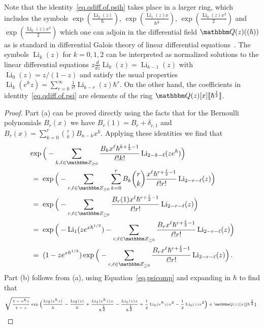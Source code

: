 \documentclass[12pt,reqno]{amsart}
\theoremstyle{definition}
\def\BZ{\mathbbm Z}
\def\BQ{\mathbbm Q}
\def\be{\begin{equation}}
\def\ee{\end{equation}}
\renewcommand{\=}{\;=\;}
\newcommand{\Li}{\operatorname{Li}}
\newcommand{\hroot}{\hbar^{\frac{1}{2}}}
\begin{document}
Note that the identity~\eqref{eq.qdiff.of.psih} takes place in a larger ring,
which includes the symbols
$\exp(\frac{\Li_{2}(z)}{\hbar})$, $\exp(\frac{\Li_{1}(z)x}{\hroot})$,
$\exp(\frac{\Li_{0}(z)x^2}{2})$ and $\exp(\frac{\Li_{0}(z)x^2}{2})$ which one can
adjoin in the differential field $\BQ(z)((\hbar))$ as is standard in differential
Galois theory of linear differential equations~\cite{Singer:galois-differential}.
The symbols $\Li_k(z)$ for $k=0,1,2$ can be interpreted as normalized solutions
to the linear differential equations $z \frac{d}{dz} \Li_k(z) = \Li_{k-1}(z)$
with $\Li_0(z)=z/(1-z)$ and satisfy the usual properties
$\Li_k(e^\hbar z) = \sum_{r=0}^\infty \frac{1}{r!} \Li_{k-r}(z) \hbar^r$.
On the other hand, the coefficients in identity~\eqref{eq.qdiff.of.psi}
are elements of the ring $\BQ(z)[x]\llbracket \hroot \rrbracket$.

\begin{proof}
Part (a) can be proved directly using the facts that for
the Bernoulli polynomials $B_{r}(x)$ we have
$B_{r}(1)=B_{r}+\delta_{r,1}$ and
$B_{r}(x)=\sum_{k=0}^{r}\binom{r}{k}B_{n-k}x^{k}$.
Applying these identities we find that
\be
\begin{aligned}
&\exp\Big(-\sum_{k,\ell\in\BZ_{\geq0}}
\frac{B_{k}x^{\ell}\hbar^{k+\frac{\ell}{2}-1}}{\ell!k!}\Li_{2-k-\ell}(ze^{\hbar})\Big)
\\
&\=
\exp\Big(-\sum_{r,\ell\in\BZ_{\geq0}}\sum_{k=0}^{r}B_{k}\binom{r}{k}
\frac{x^{\ell}\hbar^{r+\frac{\ell}{2}-1}}{\ell!r!}\Li_{2-r-\ell}(z)\Big)\\
&\=
\exp\Big(-\sum_{r,\ell\in\BZ_{\geq0}}
\frac{B_{r}(1)x^{\ell}\hbar^{r+\frac{\ell}{2}-1}}{\ell!r!}\Li_{2-r-\ell}(z)\Big)\\
&\=
\exp\Big(-\Li_{1}(ze^{x\hbar^{1/2}})-\sum_{r,\ell\in\BZ_{\geq0}}
\frac{B_{r}x^{\ell}\hbar^{r+\frac{\ell}{2}-1}}{\ell!r!}\Li_{2-r-\ell}(z)\Big)\\
&\=
(1-ze^{x\hbar^{1/2}})\exp\Big(-\sum_{r,\ell\in\BZ_{\geq0}}
\frac{B_{r}x^{\ell}\hbar^{r+\frac{\ell}{2}-1}}{\ell!r!}\Li_{2-r-\ell}(z)\Big)\,.
\end{aligned}
\ee
Part (b) follows from (a), using Equation~\eqref{eq.psicomp} and expanding
in $\hbar$ to find that
\be
\begin{tiny}
\begin{aligned}
\sqrt{\frac{1-e^{\hbar}z}{1-z}}
\exp\Big(\frac{\Li_{2}(e^{\hbar}z)}{\hbar}-\frac{\Li_{2}(z)}{\hbar}
+\frac{\Li_{1}(e^{\hbar}z)x}{\hbar^{\frac{1}{2}}}
-\frac{\Li_{1}(z)x}{\hbar^{\frac{1}{2}}}
+\frac{1}{2}\Li_{0}(e^{\hbar}z)x^2
-\frac{1}{2}\Li_{0}(z)x^2\Big)
\in\BQ(z)[x]\llbracket\hbar^{\frac{1}{2}}\rrbracket\,.
\end{aligned}
\end{tiny}
\ee
\end{proof}
\end{document}
